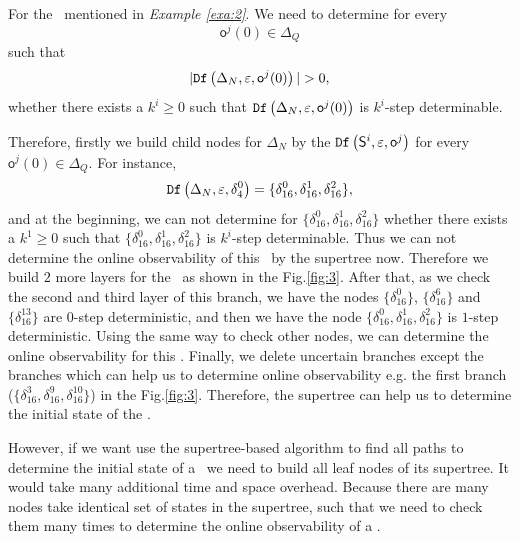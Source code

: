 \begin{example}
For the \BCN\ mentioned in {\em Example \ref{exa:2}}. We need to determine for every \[\mathsf{o}^{j}(0)\in \Delta_Q\] such that \[|\Ded\left(\Delta_N,\varepsilon, \mathsf{o}^{j}(0)\right)|> 0,\] whether there exists a $k^{i}\ge0$ such that ${\tt Df}\left(\Delta_N,\varepsilon,\mathsf{o}^{j}(0)\right)$ is $k^{i}$-step determinable.

Therefore, firstly we build child nodes for $\Delta_N$ by the ${\tt Df}\left(\mathsf{S}^i,\varepsilon, \mathsf{o}^j\right)$ for every $\mathsf{o}^{j}(0)\in \Delta_Q$. For instance, \[{\tt Df}\left(\Delta_N,\varepsilon,\delta_{4}^0\right)=\{\delta_{16}^0,\delta_{16}^1,\delta_{16}^2\},\] and at the beginning, we can not determine for $\{\delta_{16}^0,\delta_{16}^1,\delta_{16}^2\}$ whether there exists a $k^{1}\ge0$ such that $\{\delta_{16}^0,\delta_{16}^1,\delta_{16}^2\}$ is $k^{i}$-step determinable. Thus we can not determine the online observability of this \BCN\ by the supertree now. Therefore we build $2$ more layers for the \BCN\ as shown in the Fig.\ref{fig:3}. After that, as we check the second and third layer of this branch, we have the nodes $\{\delta_{16}^0\}$, $\{\delta_{16}^6\}$ and $\{\delta_{16}^{13}\}$ are $0$-step deterministic, and then we have the node $\{\delta_{16}^0,\delta_{16}^1,\delta_{16}^2\}$ is $1$-step deterministic. Using the same way to check other nodes, we can determine the online observability for this \BCN. Finally, we delete uncertain branches except the branches which can help us to determine online observability e.g. the first branch ($\{\delta_{16}^{3},\delta_{16}^{9},\delta_{16}^{10}\}$) in the Fig.\ref{fig:3}. Therefore, the supertree can help us to determine the initial state of the \BCN.%
\label{exa:11}
\end{example}   

However, if we want use the supertree-based algorithm to find all paths to determine the initial state of a \BCN\ we need to build all leaf nodes of its supertree. It would take many additional time and space overhead. Because 
 there are many nodes take identical set of states in the supertree, such that we need to check them many times to determine the online observability of a \BCN. 
 
